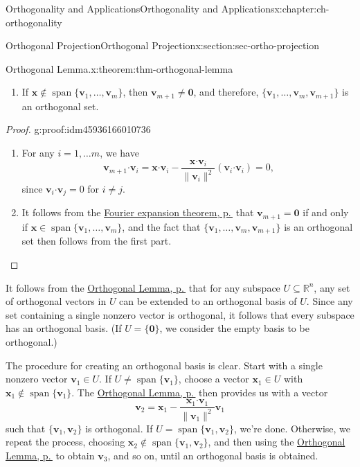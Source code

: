 \documentclass[oneside,10pt,]{book}
\numberwithin{equation}{section}
\newcommand{\spn}{\operatorname{span}}
\newcommand{\R}{\mathbb{R}}
\newcommand{\dotp}{\!\boldsymbol{\cdot}\!}
\newcommand{\len}[1]{\lVert #1\rVert}
\newcommand{\vv}{\mathbf{v}}
\newcommand{\xx}{\mathbf{x}}
\begin{document}
\begin{chapterptx}{Orthogonality and Applications}{}{Orthogonality and Applications}{}{}{x:chapter:ch-orthogonality}
\begin{sectionptx}{Orthogonal Projection}{}{Orthogonal Projection}{}{}{x:section:sec-ortho-projection}
\begin{theorem}{Orthogonal Lemma.}{}{x:theorem:thm-orthogonal-lemma}
\begin{enumerate}
\item{}If \(\xx\notin\spn\{\vv_1,\ldots, \vv_m\}\), then \(\vv_{m+1}\neq \mathbf{0}\), and therefore, \(\{\vv_1,\ldots, \vv_m,\vv_{m+1}\}\) is an orthogonal set.%
\end{enumerate}
%
\end{theorem}
\begin{proof}{}{g:proof:idm45936166010736}
%
\begin{enumerate}
\item{}For any \(i=1,\ldots m\), we have%
\begin{equation*}
\vv_{m+1}\dotp\vv_i = \xx\dotp\vv_i - \frac{\xx\dotp\vv_i}{\len{\vv_i}^2}(\vv_i\dotp\vv_i)=0\text{,}
\end{equation*}
since \(\vv_i\dotp\vv_j = 0\) for \(i\neq j\).%
\item{}It follows from the \hyperref[x:theorem:thm-fourier-expansion]{Fourier expansion theorem, p.\,\pageref{x:theorem:thm-fourier-expansion}} that \(\vv_{m+1}=\mathbf{0}\) if and only if \(\xx\in\spn\{\vv_1,\ldots, \vv_m\}\), and the fact that \(\{\vv_1,\ldots, \vv_m,\vv_{m+1}\}\) is an orthogonal set then follows from the first part.%
\end{enumerate}
%
\end{proof}
It follows from the \hyperref[x:theorem:thm-orthogonal-lemma]{Orthogonal Lemma, p.\,\pageref{x:theorem:thm-orthogonal-lemma}} that for any subspace \(U\subseteq \R^n\), any set of orthogonal vectors in \(U\) can be extended to an orthogonal basis of \(U\). Since any set containing a single nonzero vector is orthogonal, it follows that every subspace has an orthogonal basis. (If \(U=\{\mathbf{0}\}\), we consider the empty basis to be orthogonal.)%
\par
The procedure for creating an orthogonal basis is clear. Start with a single nonzero vector \(\vv_1\in U\). If \(U\neq \spn\{\vv_1\}\), choose a vector \(\xx_1\in U\) with \(\xx_1\notin\spn\{\vv_1\}\). The \hyperref[x:theorem:thm-orthogonal-lemma]{Orthogonal Lemma, p.\,\pageref{x:theorem:thm-orthogonal-lemma}} then provides us with a vector%
\begin{equation*}
\vv_2 = \xx_1-\frac{\xx_1\dotp\vv_1}{\len{\vv_1}^2}\vv_1
\end{equation*}
such that \(\{\vv_1,\vv_2\}\) is orthogonal. If \(U=\spn\{\vv_1,\vv_2\}\), we're done. Otherwise, we repeat the process, choosing \(\xx_2\notin\spn\{\vv_1,\vv_2\}\), and then using the \hyperref[x:theorem:thm-orthogonal-lemma]{Orthogonal Lemma, p.\,\pageref{x:theorem:thm-orthogonal-lemma}} to obtain \(\vv_3\), and so on, until an orthogonal basis is obtained.%

\end{sectionptx}
\end{chapterptx}
\end{document}
